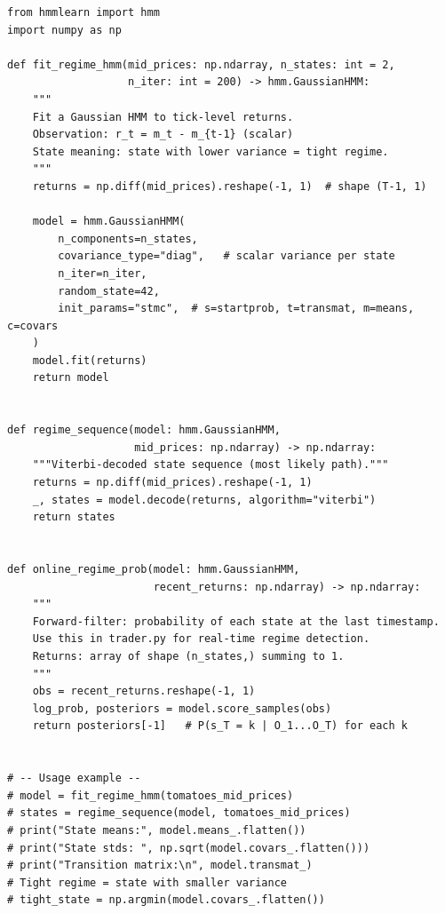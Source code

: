 \documentclass[12pt,a4paper,openany]{report}
\theoremstyle{definition}
\begin{document}
\begin{lstlisting}[caption={Gaussian HMM for TOMATOES spread regime detection using hmmlearn}]
from hmmlearn import hmm
import numpy as np

def fit_regime_hmm(mid_prices: np.ndarray, n_states: int = 2,
                   n_iter: int = 200) -> hmm.GaussianHMM:
    """
    Fit a Gaussian HMM to tick-level returns.
    Observation: r_t = m_t - m_{t-1} (scalar)
    State meaning: state with lower variance = tight regime.
    """
    returns = np.diff(mid_prices).reshape(-1, 1)  # shape (T-1, 1)

    model = hmm.GaussianHMM(
        n_components=n_states,
        covariance_type="diag",   # scalar variance per state
        n_iter=n_iter,
        random_state=42,
        init_params="stmc",  # s=startprob, t=transmat, m=means, c=covars
    )
    model.fit(returns)
    return model


def regime_sequence(model: hmm.GaussianHMM,
                    mid_prices: np.ndarray) -> np.ndarray:
    """Viterbi-decoded state sequence (most likely path)."""
    returns = np.diff(mid_prices).reshape(-1, 1)
    _, states = model.decode(returns, algorithm="viterbi")
    return states


def online_regime_prob(model: hmm.GaussianHMM,
                       recent_returns: np.ndarray) -> np.ndarray:
    """
    Forward-filter: probability of each state at the last timestamp.
    Use this in trader.py for real-time regime detection.
    Returns: array of shape (n_states,) summing to 1.
    """
    obs = recent_returns.reshape(-1, 1)
    log_prob, posteriors = model.score_samples(obs)
    return posteriors[-1]   # P(s_T = k | O_1...O_T) for each k


# -- Usage example --
# model = fit_regime_hmm(tomatoes_mid_prices)
# states = regime_sequence(model, tomatoes_mid_prices)
# print("State means:", model.means_.flatten())
# print("State stds: ", np.sqrt(model.covars_.flatten()))
# print("Transition matrix:\n", model.transmat_)
# Tight regime = state with smaller variance
# tight_state = np.argmin(model.covars_.flatten())
\end{lstlisting}
\end{document}
